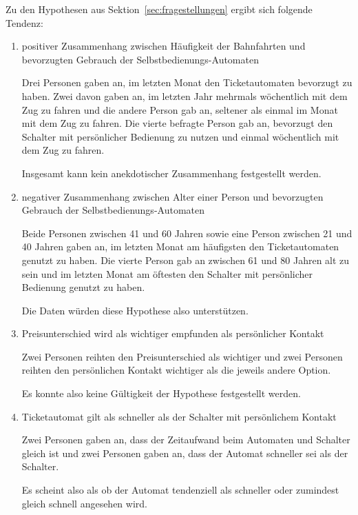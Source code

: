 \documentclass[]{article}
\begin{document}
Zu den Hypothesen aus Sektion~\ref{sec:fragestellungen} ergibt sich folgende Tendenz:

\begin{enumerate}[label={H\arabic*: }]
	\item positiver Zusammenhang zwischen Häufigkeit der Bahnfahrten und bevorzugten Gebrauch der Selbstbedienungs-Automaten
	
	Drei Personen gaben an, im letzten Monat den Ticketautomaten bevorzugt zu haben. Zwei davon gaben an, im letzten Jahr mehrmals wöchentlich mit dem Zug zu fahren und die andere Person gab an, seltener als einmal im Monat mit dem Zug zu fahren. Die vierte befragte Person gab an, bevorzugt den Schalter mit persönlicher Bedienung zu nutzen und einmal wöchentlich mit dem Zug zu fahren.
	
	Insgesamt kann kein anekdotischer Zusammenhang festgestellt werden.
	
	\item negativer Zusammenhang zwischen Alter einer Person und bevorzugten Gebrauch der Selbstbedienungs-Automaten
	
	Beide Personen zwischen 41 und 60 Jahren sowie eine Person zwischen 21 und 40 Jahren gaben an, im letzten Monat am häufigsten den Ticketautomaten genutzt zu haben. Die vierte Person gab an zwischen 61 und 80 Jahren alt zu sein und im letzten Monat am öftesten den Schalter mit persönlicher Bedienung genutzt zu haben.
	
	Die Daten würden diese Hypothese also unterstützen.
	
	\item Preisunterschied wird als wichtiger empfunden als persönlicher Kontakt
	
	Zwei Personen reihten den Preisunterschied als wichtiger und zwei Personen reihten den persönlichen Kontakt wichtiger als die jeweils andere Option.
	
	Es konnte also keine Gültigkeit der Hypothese festgestellt werden.
	
	\item Ticketautomat gilt als schneller als der Schalter mit persönlichem Kontakt
	
	Zwei Personen gaben an, dass der Zeitaufwand beim Automaten und Schalter gleich ist und zwei Personen gaben an, dass der Automat schneller sei als der Schalter.
	
	Es scheint also als ob der Automat tendenziell als schneller oder zumindest gleich schnell angesehen wird.
\end{enumerate}



\end{document}
